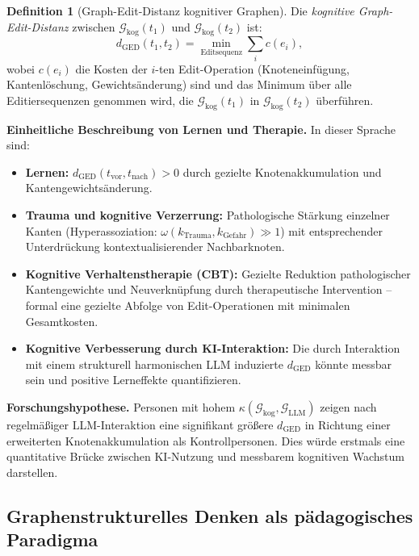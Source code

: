 ﻿\documentclass[12pt,a4paper]{article}
\theoremstyle{plain}
\theoremstyle{definition}
\newtheorem{definition}[theorem]{Definition}
\theoremstyle{remark}
\newcommand{\GG}{\mathcal{G}}
\begin{document}
\begin{definition}[Graph-Edit-Distanz kognitiver Graphen]
Die \emph{kognitive Graph-Edit-Distanz} zwischen $\GG_{\text{kog}}(t_1)$ und $\GG_{\text{kog}}(t_2)$ ist:
\[
  d_{\text{GED}}(t_1, t_2) = \min_{\text{Editsequenz}} \sum_{i} c(e_i),
\]
wobei $c(e_i)$ die Kosten der $i$-ten Edit-Operation (Knoteneinfügung, Kantenlöschung, Gewichtsänderung) sind und das Minimum über alle Editiersequenzen genommen wird, die $\GG_{\text{kog}}(t_1)$ in $\GG_{\text{kog}}(t_2)$ überführen.
\end{definition}

\textbf{Einheitliche Beschreibung von Lernen und Therapie.} In dieser Sprache sind:
\begin{itemize}
  \item \textbf{Lernen:} $d_{\text{GED}}(t_{\text{vor}}, t_{\text{nach}}) > 0$ durch gezielte Knotenakkumulation und Kantengewichtsänderung.
  \item \textbf{Trauma und kognitive Verzerrung:} Pathologische Stärkung einzelner Kanten (Hyperassoziation: $\omega(k_{\text{Trauma}}, k_{\text{Gefahr}}) \gg 1$) mit entsprechender Unterdrückung kontextualisierender Nachbarknoten.
  \item \textbf{Kognitive Verhaltenstherapie (CBT):} Gezielte Reduktion pathologischer Kantengewichte und Neuverknüpfung durch therapeutische Intervention -- formal eine gezielte Abfolge von Edit-Operationen mit minimalen Gesamtkosten.
  \item \textbf{Kognitive Verbesserung durch KI-Interaktion:} Die durch Interaktion mit einem strukturell harmonischen LLM induzierte $d_{\text{GED}}$ könnte messbar sein und positive Lerneffekte quantifizieren.
\end{itemize}

\textbf{Forschungshypothese.} Personen mit hohem $\kappa(\GG_{\text{kog}}, \GG_{\text{LLM}})$ zeigen nach regelmäßiger LLM-Interaktion eine signifikant größere $d_{\text{GED}}$ in Richtung einer erweiterten Knotenakkumulation als Kontrollpersonen. Dies würde erstmals eine quantitative Brücke zwischen KI-Nutzung und messbarem kognitiven Wachstum darstellen.

\subsection{Graphenstrukturelles Denken als pädagogisches Paradigma}
\label{subsec:paedagogik}
\end{document}
